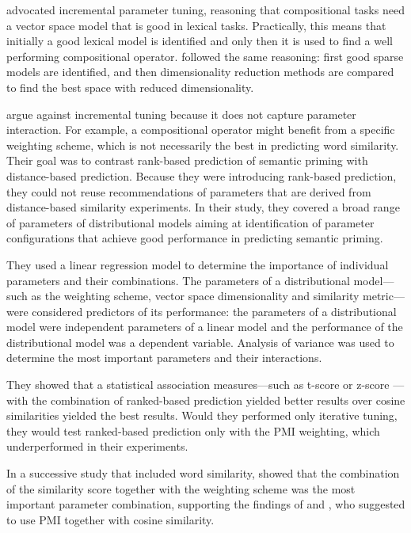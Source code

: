 \citet{kiela-clark:2014:CVSC} advocated incremental parameter tuning, reasoning that compositional tasks need a vector space model that is good in lexical tasks. Practically, this means that initially a good lexical model is identified and only then it is used to find a well performing compositional operator. \citet{BullinariaLevy2012} followed the same reasoning: first good sparse models are identified, and then dimensionality reduction methods are compared to find the best space with reduced dimensionality.

\citet{lapesa-evert:2013:CMCL} argue against incremental tuning because it does not capture parameter interaction. For example, a compositional operator might benefit from a specific weighting scheme, which is not necessarily the best in predicting word similarity. Their goal was to contrast rank-based prediction of semantic priming with distance-based prediction. Because they were introducing rank-based prediction, they could not reuse recommendations of parameters that are derived from distance-based similarity experiments. In their study, they covered a broad range of parameters of distributional models aiming at identification of parameter configurations that achieve good performance in predicting semantic priming.

They used a linear regression model to determine the importance of individual parameters and their combinations. The parameters of a distributional model---such as the weighting scheme, vector space dimensionality and similarity metric---were considered predictors of its performance: the parameters of a distributional model were independent parameters of a linear model and the performance of the distributional model was a dependent variable. Analysis of variance was used to determine the most important parameters and their interactions.

They showed that a statistical association measures---such as t-score or z-score \cite{Evert05}---with the combination of ranked-based prediction yielded better results over cosine similarities yielded the best results. Would they performed only iterative tuning, they would test ranked-based prediction only with the PMI weighting, which underperformed in their experiments.

In a successive study that included word similarity, \citet{lapesa2014large} showed that the combination of the similarity score together with the weighting scheme was the most important parameter combination, supporting the findings of  and , who suggested to use PMI together with cosine similarity.

